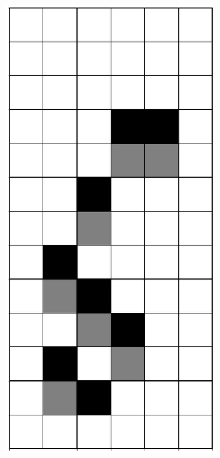 \documentclass[12pt]{article}
\numberwithin{figure}{section} %
\begin{document}
\begin{figure}[H]
\begin{subfigure}{0.3\textwidth}
     \includegraphics[angle=270,width=\linewidth]{Section4/11.0}
     \subcaption{}
   \end{subfigure}

\end{figure}
\end{document}
